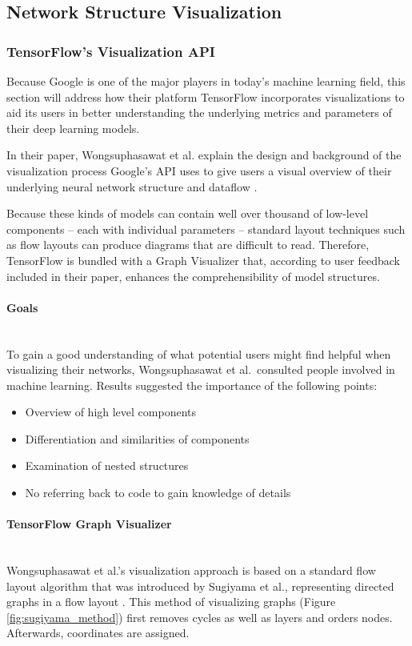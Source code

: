 \documentclass{acmsiggraph}               %
\newcommand{\paragraphbr}[1]{\paragraph{#1}\mbox{}\\}
\begin{document}
\subsection{Network Structure Visualization}
\subsubsection{TensorFlow's Visualization API}
Because Google is one of the major players in today's machine learning field, this section will address how their platform TensorFlow incorporates visualizations to aid its users in better understanding the underlying metrics and parameters of their deep learning models.

In their paper, Wongsuphasawat et al. explain the design and background of the visualization process Google's API uses to give users a visual overview of their underlying neural network structure and dataflow \cite{Wongsuphasawat2018}.

Because these kinds of models can contain well over thousand of low-level components -- each with individual parameters -- standard layout techniques such as flow layouts can produce diagrams that are difficult to read. Therefore, TensorFlow is bundled with a Graph Visualizer that, according to user feedback included in their paper, enhances the comprehensibility of model structures.

\paragraphbr{Goals}

To gain a good understanding of what potential users might find helpful when visualizing their networks, Wongsuphasawat et al.~consulted people involved in machine learning. Results suggested the importance of the following points:

\begin{itemize}
  \setlength\itemsep{0em}
  \item Overview of high level components
  \item Differentiation and similarities of components
  \item Examination of nested structures
  \item No referring back to code to gain knowledge of details
\end{itemize}

\paragraphbr{TensorFlow Graph Visualizer}

Wongsuphasawat et al.'s visualization approach is based on a standard flow layout algorithm that was introduced by Sugiyama et al., representing directed graphs in a flow layout \cite{Sugiyama1981}. This method of visualizing graphs (Figure \ref{fig:sugiyama_method}) first removes cycles as well as layers and orders nodes. Afterwards, coordinates are assigned.
\end{document}
